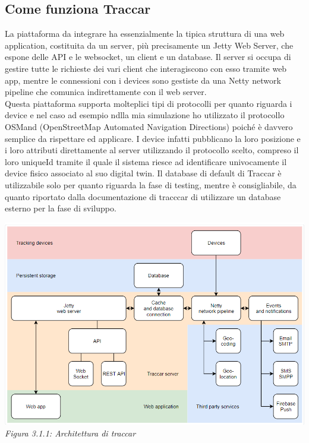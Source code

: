 \documentclass[a4paper,titlepage,12pt]{book}
\begin{document}
\subsection{
\sffamily Come funziona Traccar}
La piattaforma da integrare ha essenzialmente la tipica struttura di una web application, costituita da un server, più precisamente un Jetty Web Server, che espone delle API e le websocket, un client e un database. Il server si occupa di gestire tutte le richieste dei vari client che interagiscono con esso tramite web app, mentre le connessioni con i devices sono gestiste da una Netty network pipeline che comunica indirettamente con il web server. \\
Questa piattaforma supporta molteplici tipi di protocolli per quanto riguarda i device e nel caso ad esempio ndlla mia simulazione ho utilizzato il protocollo OSMand (OpenStreetMap Automated Navigation Directions) poiché è davvero semplice da rispettare ed applicare. I device infatti pubblicano la loro posizione e i loro attributi direttamente al server utilizzando il protocollo scelto, compreso il loro uniqueId tramite il quale il sistema riesce ad identificare univocamente il device fisico associato al suo digital twin. Il database di default di Traccar è utilizzabile solo per quanto riguarda la fase di testing, mentre è consigliabile, da quanto riportato dalla documentazione di tracccar di utilizzare un database esterno per la fase di sviluppo. 

\begin{center}
\includegraphics[scale=0.7]{images/arcTraccar.png} \\
\textit{Figura 3.1.1: Architettura di traccar}\label{fig:}
\end{center}
\end{document}
